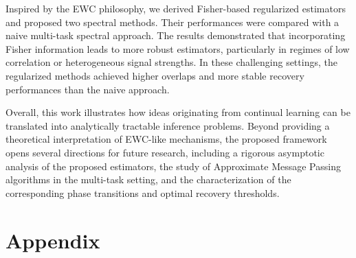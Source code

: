 \documentclass[11pt]{article}
\begin{document}
\begin{rem}
Inspired by the EWC philosophy, we derived Fisher-based regularized estimators and proposed two spectral methods. Their performances were compared with a naive multi-task spectral approach. The results demonstrated that incorporating Fisher information leads to more robust estimators, particularly in regimes of low correlation or heterogeneous signal strengths. In these challenging settings, the regularized methods achieved higher overlaps and more stable recovery performances than the naive approach.

Overall, this work illustrates how ideas originating from continual learning can be translated into analytically tractable inference problems. Beyond providing a theoretical interpretation of EWC-like mechanisms, the proposed framework opens several directions for future research, including a rigorous asymptotic analysis of the proposed estimators, the study of Approximate Message Passing algorithms in the multi-task setting, and the characterization of the corresponding phase transitions and optimal recovery thresholds.










\appendix
\section{Appendix}


\end{rem}
\end{document}
